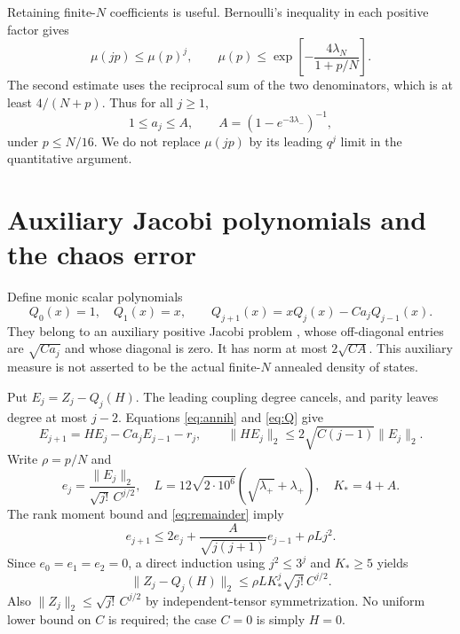 \documentclass[11pt,a4paper]{article}
\begin{document}
Retaining finite-$N$ coefficients is useful. Bernoulli's inequality
in each positive factor gives
\begin{equation}
 \mu(jp)\le\mu(p)^j,\qquad
 \mu(p)\le\exp\!\left[-\frac{4\lambda_N}{1+p/N}\right].
\end{equation}
The second estimate uses the reciprocal sum of the two denominators,
which is at least $4/(N+p)$. Thus for all $j\ge1$,
\begin{equation}
 1\le a_j\le A,\qquad A=(1-e^{-3\lambda_-})^{-1},
\end{equation}
under $p\le N/16$. We do not replace $\mu(jp)$ by its leading
$q^j$ limit in the quantitative argument.

\newpage
\section{Auxiliary Jacobi polynomials and the chaos error}
Define monic scalar polynomials
\begin{equation}
 Q_0(x)=1,\quad Q_1(x)=x,\qquad
 Q_{j+1}(x)=xQ_j(x)-Ca_jQ_{j-1}(x).
 \label{eq:Q}
\end{equation}
They belong to an auxiliary positive Jacobi problem \cite{DLMF},
whose off-diagonal entries are $\sqrt{Ca_j}$ and whose diagonal
is zero. It has norm at most $2\sqrt{CA}$.
This auxiliary measure is not asserted to be the actual finite-$N$
annealed density of states.

Put $E_j=Z_j-Q_j(H)$. The leading coupling degree cancels, and
parity leaves degree at most $j-2$. Equations \eqref{eq:annih}
and \eqref{eq:Q} give
\begin{equation}
 E_{j+1}=HE_j-Ca_jE_{j-1}-r_j,
 \qquad \|HE_j\|_2\le2\sqrt{C(j-1)}\|E_j\|_2.
\end{equation}
Write $\rho=p/N$ and
\begin{equation}
 e_j=\frac{\|E_j\|_2}{\sqrt{j!}\,C^{j/2}},\quad
 L=12\sqrt{2\cdot10^6}(\sqrt{\lambda_+}+\lambda_+),\quad K_*=4+A.
\end{equation}
The rank moment bound and \eqref{eq:remainder} imply
\begin{equation}
 e_{j+1}\le2e_j+\frac{A}{\sqrt{j(j+1)}}e_{j-1}+\rho L j^2.
\end{equation}
Since $e_0=e_1=e_2=0$, a direct induction using $j^2\le3^j$
and $K_*\ge5$ yields
\begin{equation}
 \boxed{\quad
 \|Z_j-Q_j(H)\|_2
 \le\rho L K_*^j\sqrt{j!}\,C^{j/2}.\quad}
 \label{eq:bridgepoly}
\end{equation}
Also $\|Z_j\|_2\le\sqrt{j!}\,C^{j/2}$ by independent-tensor
symmetrization. No uniform lower bound on $C$ is required;
the case $C=0$ is simply $H=0$.
\end{document}
